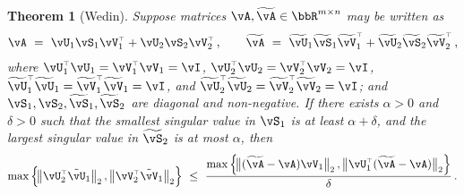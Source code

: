 \documentclass[11pt]{article}
\newcommand{\wt}{\ensuremath{\widetilde}}
\renewcommand\t{{\ensuremath{\scriptscriptstyle{\top}}}}
\newtheorem{theorem}{Theorem}
\theoremstyle{definition}
\begin{document}
\begin{theorem}[Wedin]
  \label{thm:wedin}
  Suppose matrices $\vA, \wt\vA \in \bbR^{m \times n}$ may be written as
  \begin{align*}
    \vA \ = \ \vU_1 \vS_1 \vV_1^\t + \vU_2 \vS_2 \vV_2^\t \,,
    \qquad
    \wt\vA \ = \ \wt\vU_1 \wt\vS_1 \wt\vV_1^\t + \wt\vU_2 \wt\vS_2 \wt\vV_2^\t \,,
  \end{align*}
  where $\vU_1^\t \vU_1 = \vV_1^\t \vV_1 = \vI$,
  $\vU_2^\t \vU_2 = \vV_2^\t \vV_2 = \vI$,
  $\wt\vU_1^\t \wt\vU_1 = \wt\vV_1^\t \wt\vV_1 = \vI$, and
  $\wt\vU_2^\t \wt\vU_2 = \wt\vV_2^\t \wt\vV_2 = \vI$;
  and $\vS_1, \vS_2, \wt\vS_1, \wt\vS_2$ are diagonal and non-negative.
  If there exists $\alpha > 0$ and $\delta > 0$ such that the smallest singular
  value in $\vS_1$ is at least $\alpha + \delta$, and the largest singular value
  in $\wt\vS_2$ is at most $\alpha$, then
  \begin{equation*}
    \max\cbr{
      \norm[1]{\vU_2^\t\tilde\vU_1}_2 ,\,
      \norm[1]{\vV_2^\t\tilde\vV_1}_2
    } \ \leq \
    \frac{\max\cbr{\norm[1]{(\wt\vA-\vA)\vV_1}_2 ,\,
    \norm[1]{\vU_1^\t(\wt\vA-\vA)}_2}}{\delta}
    \,.
  \end{equation*}
\end{theorem}


\end{document}
